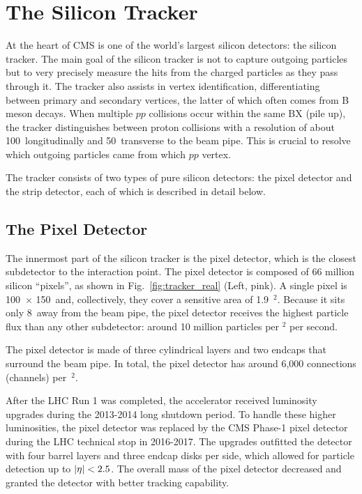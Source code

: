 \section{The Silicon Tracker}
\label{sec:tracker}

At the heart of CMS is one of the world's largest silicon detectors: the silicon tracker.
The main goal of the silicon tracker is not to capture outgoing particles but to very precisely measure the hits from the charged particles as they pass through it.
The tracker also assists in vertex identification, differentiating between primary and secondary vertices, the latter of which often comes from B meson decays.
When multiple $pp$ collisions occur within the same BX (pile up), the tracker distinguishes between proton collisions with a resolution of about 100~\mum longitudinally and 50~\mum transverse to the beam pipe.
This is crucial to resolve which outgoing particles came from which $pp$ vertex.

The tracker consists of two types of pure silicon detectors: the pixel detector and the strip detector, each of which is described in detail below.

\subsection{The Pixel Detector}
\label{subsec:pixel}

The innermost part of the silicon tracker is the pixel detector, which is the closest subdetector to the interaction point.
The pixel detector is composed of 66 million silicon ``pixels'', as shown in Fig.~\ref{fig:tracker_real} (Left, pink).
A single pixel is 100~\mum $\times$ 150~\mum and, collectively, they cover a sensitive area of 1.9~\meter$^2$.
Because it sits only 8~\cm away from the beam pipe, the pixel detector receives the highest particle flux than any other subdetector:
around 10 million particles per \cm$^2$ per second.

The pixel detector is made of three cylindrical layers and two endcaps that surround the beam pipe.
In total, the pixel detector has around 6,000 connections (channels) per~\cm$^2$.

After the LHC Run 1 was completed, the accelerator received luminosity upgrades during the 2013-2014 long shutdown period.
To handle these higher luminosities, the pixel detector was replaced by the CMS Phase-1 pixel detector during the LHC technical stop in 2016-2017.
The upgrades outfitted the detector with four barrel layers and three endcap disks per side, which allowed for particle detection up to $\left|\eta\right| < 2.5$.
The overall mass of the pixel detector decreased and granted the detector with better tracking capability.

